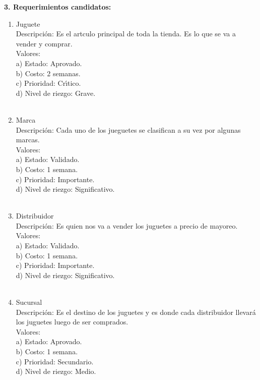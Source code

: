 \documentclass[letterpaper,11pt]{article}
\begin{document}
 \begin{center}
   {\bf 3. Requerimientos candidatos: }
 \end{center}

 \begin{enumerate}
 \item Juguete\\
   Descripci\'on: Es el art\´{\i}culo principal de toda la tienda. Es lo que se va a vender y comprar. \\

   Valores:\\
   a) Estado: Aprovado. \\
   b) Costo: 2 semanas. \\
   c) Prioridad: Cr\'{\i}tico.\\
   d) Nivel de riezgo: Grave. \\
   \\
 \item Marca\\
   Descripci\'on: Cada uno de los jueguetes se clasifican a su vez por algunas marcas.\\

   Valores:\\
   a) Estado: Validado. \\
   b) Costo: 1 semana.\\
   c) Prioridad: Importante.\\
   d) Nivel de riezgo: Significativo.\\
   \\

   \item Distribuidor\\
   Descripci\'on: Es quien nos va a vender los juguetes a precio de mayoreo.\\

   Valores:\\
   a) Estado: Validado.\\
   b) Costo: 1 semana.\\
   c) Prioridad: Importante.\\
   d) Nivel de riezgo: Significativo.\\
   \\

   \item Sucursal\\
   Descripci\'on: Es el destino de los juguetes y es donde cada distribuidor llevar\'a los juguetes luego de ser comprados.\\

   Valores:\\
   a) Estado: Aprovado.\\
   b) Costo: 1 semana.\\
   c) Prioridad: Secundario.\\
   d) Nivel de riezgo: Medio.\\
   \\


\end{enumerate}
\end{document}
